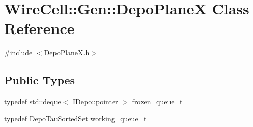 \hypertarget{class_wire_cell_1_1_gen_1_1_depo_plane_x}{}\section{Wire\+Cell\+:\+:Gen\+:\+:Depo\+PlaneX Class Reference}
\label{class_wire_cell_1_1_gen_1_1_depo_plane_x}


{\ttfamily \#include $<$Depo\+Plane\+X.\+h$>$}

\subsection*{Public Types}
\begin{DoxyCompactItemize}
\item 
typedef std\+::deque$<$ \hyperlink{class_wire_cell_1_1_i_data_aff870b3ae8333cf9265941eef62498bc}{I\+Depo\+::pointer} $>$ \hyperlink{class_wire_cell_1_1_gen_1_1_depo_plane_x_a4f4387d05fb9d3a02c96da6abac2861e}{frozen\+\_\+queue\+\_\+t}
\item 
typedef \hyperlink{namespace_wire_cell_ac01bef08345e4a479b147822eef2a405}{Depo\+Tau\+Sorted\+Set} \hyperlink{class_wire_cell_1_1_gen_1_1_depo_plane_x_ade1129aabbdd7bc1d4e880169d715a19}{working\+\_\+queue\+\_\+t}
\end{DoxyCompactItemize}
